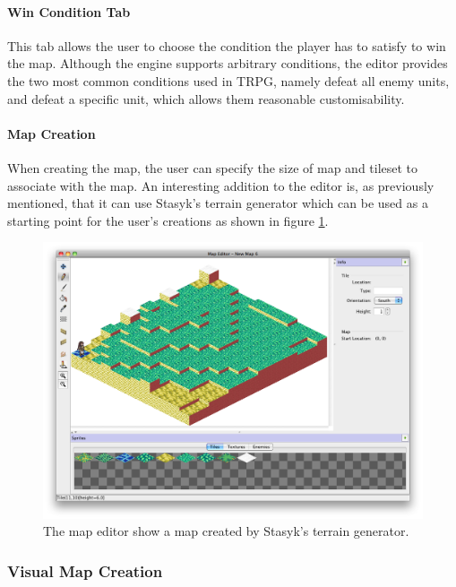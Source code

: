 \paragraph{Win Condition Tab\\}
This tab allows the user to choose the condition the player has to satisfy to win the map. Although the engine supports arbitrary conditions, the editor provides the two most common conditions used in TRPG, namely defeat all enemy units, and defeat a specific unit, which allows them  reasonable customisability.

\paragraph{Map Creation\\}
When creating the map, the user can specify the size of map and tileset to associate with the map.  An interesting addition to the editor is, as previously  mentioned, that it can use Stasyk's terrain generator which can be used as a starting point for the user's creations as shown in figure \ref{fig:figures_editor_gen}.

\begin{figure}[htb]
	\centering
		\includegraphics[width=\textwidth]{figures/editor/gen.png}
	\caption{The map editor show a map created by Stasyk's terrain generator.}
	\label{fig:figures_editor_gen}
\end{figure}

\subsubsection{Visual Map Creation}
\label{ssub:visual_map_creation}

